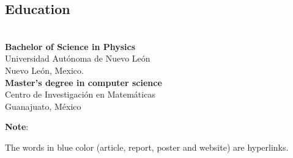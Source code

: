 \documentclass[a3paper]{adcv_color}
\begin{document}
\begin{multicols}{2}
      \section{Education}\\

      \textbf{Bachelor of Science in Physics} \\
      Universidad Autónoma de Nuevo León\\
      Nuevo León, Mexico.\\

      \textbf{Master's degree in computer science}\\
      Centro de Investigación en Matemáticas\\
      Guanajuato, México
    \end{multicols}
    \begin{flushleft}
      \changefontsizes{10pt}
      \textbf{Note}:

      The words in blue color (article, report, poster and website) are hyperlinks.
    \end{flushleft}
    
\end{document}
